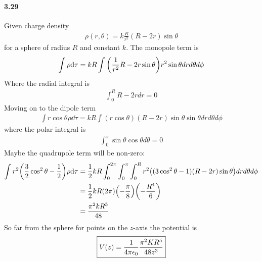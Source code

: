 \documentclass[../main.tex]{subfiles}
\begin{document}
\paragraph{3.29} Given charge density
\begin{align*}
    \rho(r, \theta) = k \frac{R}{r^2} (R - 2r) \sin\theta
\end{align*}
for a sphere of radius $R$ and constant $k$. The monopole term is
\begin{align*}
    \int \rho \dd\tau = kR \int \qt(
        \frac{1}{r^2}{R - 2r} \sin\theta
    ) r^2 \sin\theta dr d\theta d\phi
\end{align*}
Where the radial integral is
\begin{align*}
    \int_0^R R - 2r dr = 0
\end{align*}
Moving on to the dipole term
\begin{align*}
    \int r \cos\theta \rho \dd\tau = kR \int (r\cos\theta) (R - 2r) \sin\theta \sin\theta dr d\theta d\phi
\end{align*}
where the polar integral is
\begin{align*}
    \int_0^\pi \sin\theta \cos\theta d\theta = 0
\end{align*}
Maybe the quadrupole term will be non-zero:
\begin{align*}
    \int r^2 \qt(
        \frac{3}{2} \cos^2\theta - \frac{1}{2}) \rho \dd\tau &= \frac{1}{2} kR \int_0^{2\pi} \int_0^\pi \int_0^R r^2 \qt(
                (3\cos^2\theta - 1) (R - 2r) \sin\theta) dr d\theta d\phi \\
    &= \frac{1}{2} kR (2\pi) \qt(-\frac{\pi}{8}) \qt(-\frac{R^4}{6}) \\
    &= \frac{\pi^2 k R^5}{48}
\end{align*}
So far from the sphere for points on the $z$-axis the potential is
\begin{align*}
    \boxed{
        V(z) = \frac{1}{4\pi\epsilon_0} \frac{\pi^2 K R^5}{48 z^3}
    }
\end{align*}

\newpage 
\end{document}
